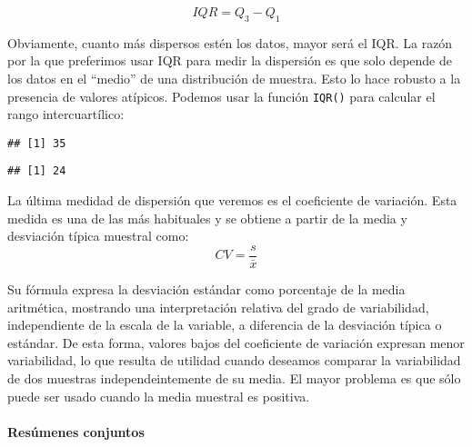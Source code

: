 \documentclass[
]{book}
\newenvironment{Shaded}{\begin{snugshade}}{\end{snugshade}}
\newcommand{\FunctionTok}[1]{\textcolor[rgb]{0.00,0.00,0.00}{#1}}
\newcommand{\NormalTok}[1]{#1}
\newcommand{\SpecialCharTok}[1]{\textcolor[rgb]{0.00,0.00,0.00}{#1}}
\begin{document}
\begin{equation} 
 IQR = Q_3 - Q_1
  \label{eq:iqr}
\end{equation}

Obviamente, cuanto más dispersos estén los datos, mayor será el IQR. La razón por la que preferimos usar IQR para medir la dispersión es que solo depende de los datos en el ``medio'' de una distribución de muestra. Esto lo hace robusto a la presencia de valores atípicos. Podemos usar la función \texttt{IQR()} para calcular el rango intercuartílico:

\begin{Shaded}
\end{Shaded}

\begin{verbatim}
## [1] 35
\end{verbatim}

\begin{Shaded}
\end{Shaded}

\begin{verbatim}
## [1] 24
\end{verbatim}

La última medidad de dispersión que veremos es el coeficiente de variación. Esta medida es una de las más habituales y se obtiene a partir de la media y desviación típica muestral como: \begin{equation} 
 CV = \frac{s}{\bar{x}}
  \label{eq:cv}
\end{equation}

Su fórmula expresa la desviación estándar como porcentaje de la media aritmética, mostrando una interpretación relativa del grado de variabilidad, independiente de la escala de la variable, a diferencia de la desviación típica o estándar. De esta forma, valores bajos del coeficiente de variación expresan menor variabilidad, lo que resulta de utilidad cuando deseamos comparar la variabilidad de dos muestras independeintemente de su media. El mayor problema es que sólo puede ser usado cuando la media muestral es positiva.

\hypertarget{resuxfamenes-conjuntos}{%
\paragraph{Resúmenes conjuntos}\label{resuxfamenes-conjuntos}}
\end{document}
